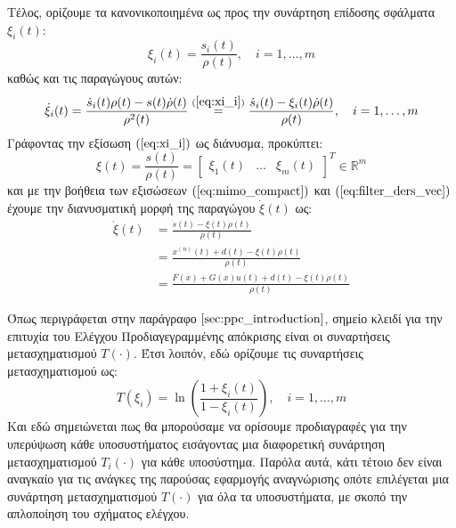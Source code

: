 Τέλος, ορίζουμε τα κανονικοποιημένα ως προς την συνάρτηση επίδοσης σφάλματα $\xi_i(t)$:
\begin{equation}
	\xi_i(t) = \frac{s_i(t)}{\rho(t)}, \quad i=1,\dots,m
	\label{eq:xi_i}
\end{equation}
καθώς και τις παραγώγους αυτών:
\begin{equation}
	\dot{\xi}_i(t) =
	\frac{\dot{s}_i(t) \rho(t) - s(t) \dot{\rho}(t)}
	{\rho^2(t)} \stackrel{(\ref{eq:xi_i})}{=}
	\frac{\dot{s}_i(t) - \xi_i(t) \dot{\rho}(t)}{\rho(t)},
	\quad i=1,\dots,m
	\label{eq:xi_i_dot}
\end{equation}
Γράφοντας την εξίσωση $(\ref{eq:xi_i})$ ως διάνυσμα, προκύπτει:
\begin{equation}
	\xi(t) = \frac{s(t)}{\rho(t)} = \begin{bmatrix}\xi_1(t) & \dots & \xi_m(t)\end{bmatrix}^T 
	\in \mathbb{R}^m
\end{equation}
και με την βοήθεια των εξισώσεων $(\ref{eq:mimo_compact})$ και  $(\ref{eq:filter_ders_vec})$ έχουμε την διανυσματική μορφή της παραγώγου $\dot{\xi}(t)$ ως:
\begin{equation}
\begin{split}
\dot{\xi}(t) &= \frac{\dot{s}(t) - \xi(t) \dot{\rho}(t)}{\rho(t)} \\
             &= \frac{x^{(n)}(t) + d(t) - \xi(t) \dot{\rho}(t)}{\rho(t)}\\
             &=\frac{F(x) + G(x)u(t) + d(t) - \xi(t)\dot{\rho}(t)}{\rho(t)}
\end{split}
\label{eq:xi_dot}
\end{equation}

Όπως περιγράφεται στην παράγραφο $\ref{sec:ppc_introduction}$, σημείο κλειδί για την επιτυχία του Ελέγχου Προδιαγεγραμμένης απόκρισης είναι οι συναρτήσεις μετασχηματισμού $T(\cdot)$. Έτσι λοιπόν, εδώ ορίζουμε τις συναρτήσεις μετασχηματισμού ως:
\begin{equation}
	T(\xi_i) = \ln \left( \frac{1 + \xi_i(t)}{1 - \xi_i(t)} \right),
	\quad i=1,\dots,m
\end{equation}
Και εδώ σημειώνεται πως θα μπορούσαμε να ορίσουμε προδιαγραφές για την υπερύψωση κάθε υποσυστήματος εισάγοντας μια διαφορετική συνάρτηση μετασχηματισμού $T_i(\cdot)$ για κάθε υποσύστημα. Παρόλα αυτά, κάτι τέτοιο δεν είναι αναγκαίο για τις ανάγκες της παρούσας εφαρμογής αναγνώρισης οπότε επιλέγεται μια συνάρτηση μετασχηματισμού $T(\cdot)$ για όλα τα υποσυστήματα, με σκοπό την απλοποίηση του σχήματος ελέγχου.


